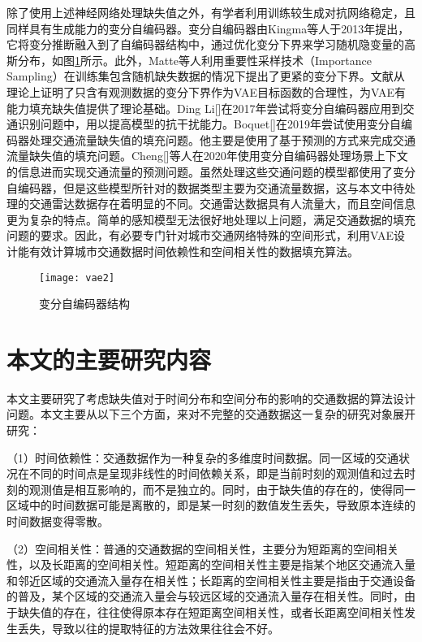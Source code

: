 除了使用上述神经网络处理缺失值之外，有学者利用训练较生成对抗网络稳定，且同样具有生成能力的变分自编码器。变分自编码器由Kingma\cite{kingma2013auto}等人于2013年提出，它将变分推断融入到了自编码器结构中，通过优化变分下界来学习随机隐变量的高斯分布，如图\ref{vae}所示。此外，Matte\cite{mattei2019miwae}等人利用重要性采样技术（Importance Sampling）在训练集包含随机缺失数据的情况下提出了更紧的变分下界。文献从理论上证明了只含有观测数据的变分下界作为VAE目标函数的合理性，为VAE有能力填充缺失值提供了理论基础。Ding Li[]在2017年尝试将变分自编码器应用到交通识别问题中，用以提高模型的抗干扰能力。Boquet[]在2019年尝试使用变分自编码器处理交通流量缺失值的填充问题。他主要是使用了基于预测的方式来完成交通流量缺失值的填充问题。Cheng[]等人在2020年使用变分自编码器处理场景上下文的信息进而实现交通流量的预测问题。虽然处理这些交通问题的模型都使用了变分自编码器，但是这些模型所针对的数据类型主要为交通流量数据，这与本文中待处理的交通雷达数据存在着明显的不同。交通雷达数据具有人流量大，而且空间信息更为复杂的特点。简单的感知模型无法很好地处理以上问题，满足交通数据的填充问题的要求。因此，有必要专门针对城市交通网络特殊的空间形式，利用VAE设计能有效计算城市交通数据时间依赖性和空间相关性的数据填充算法。

\begin{figure}[htbp]
\centering
\texttt{[image: vae2]}
\vspace{-1em}
\caption{变分自编码器结构 \label{vae}}
\end{figure}

\section{本文的主要研究内容}
本文主要研究了考虑缺失值对于时间分布和空间分布的影响的交通数据的算法设计问题。本文主要从以下三个方面，来对不完整的交通数据这一复杂的研究对象展开研究：

（1）时间依赖性：交通数据作为一种复杂的多维度时间数据。同一区域的交通状况在不同的时间点是呈现非线性的时间依赖关系，即是当前时刻的观测值和过去时刻的观测值是相互影响的，而不是独立的。同时，由于缺失值的存在的，使得同一区域中的时间数据可能是离散的，即是某一时刻的数值发生丢失，导致原本连续的时间数据变得零散。

（2）空间相关性：普通的交通数据的空间相关性，主要分为短距离的空间相关性，以及长距离的空间相关性。短距离的空间相关性主要是指某个地区交通流入量和邻近区域的交通流入量存在相关性；长距离的空间相关性主要是指由于交通设备的普及，某个区域的交通流入量会与较远区域的交通流入量存在相关性。同时，由于缺失值的存在，往往使得原本存在短距离空间相关性，或者长距离空间相关性发生丢失，导致以往的提取特征的方法效果往往会不好。

